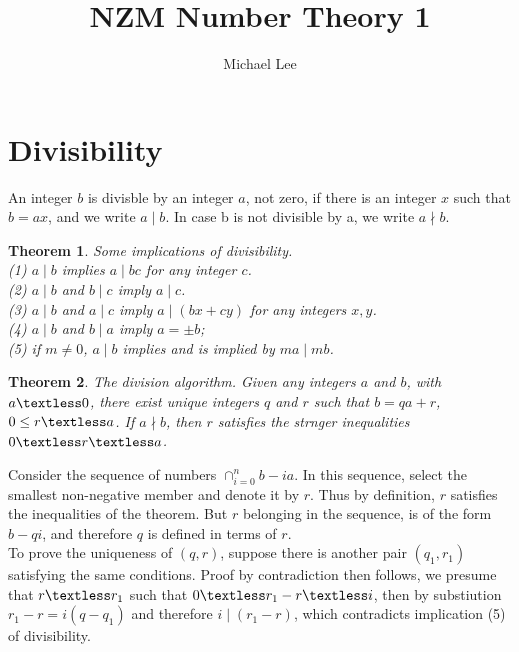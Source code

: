 \documentclass[11pt]{article} %
\title{NZM Number Theory 1}
\author{Michael Lee}
\date{} %
\newtheorem{theorem}{Theorem}[section]
\newenvironment{proof}[1][Proof]{\begin{trivlist}
\item[\hskip \labelsep {\bfseries #1}]}{\end{trivlist}}
\newenvironment{definition}[1][Definition]{\begin{trivlist}
\item[\hskip \labelsep {\bfseries #1}]}{\end{trivlist}}
\begin{document}
\maketitle
\section{Divisibility}
\begin{definition}
	An integer $b$ is divisble by an integer $a$, not zero, if there is an integer $x$ such that $b = ax$, and we write $ a \mid b$. In case b is not divisible by a, we write $ a \nmid b. $ 
\end{definition}

\begin{theorem}
	Some implications of divisibility. 
	\\ (1) $ a \mid b $ implies $ a \mid bc $ for any integer $c$. 
	\\ (2) $ a \mid b $ and $b \mid c$ imply $a \mid c$. 
	\\ (3) $ a \mid b $ and $a \mid c$ imply $a \mid (bx + cy) $ for any integers $x, y$. 
	\\ (4) $ a \mid b $ and $b \mid a$ imply $a = \pm b$; 
	\\ (5) if $m \neq 0$, $ a \mid b $ implies and is implied by $ma \mid mb$. \\
\end{theorem}

\begin{theorem}
	The division algorithm. Given any integers $a$ and $b$, with $a \textless 0$, there exist unique integers $q$ and $r$ such that $b = qa + r$, $0 \le r \textless a$. If $a \nmid b$, then $r$ satisfies the strnger inequalities $0 \textless r \textless a$. 
\end{theorem}

\begin{proof}
	Consider the sequence of numbers $ \cap_{i = 0}^{n}{b - ia} $. In this sequence, select the smallest non-negative member and denote it by $r$. Thus by definition, $r$ satisfies the inequalities of the theorem. But $r$ belonging in the sequence, is of the form $b - qi$, and therefore $q$ is defined in terms of $r$. 
\\ To prove the uniqueness of $ (q, r) $, suppose there is another pair $ (q_1, r_1) $ satisfying the same conditions. Proof by contradiction then follows, we presume that $r \textless r_1$ such that $0 \textless r_1 - r \textless i$, then by substiution $r_1 - r = i(q - q_1)$ and therefore $i \mid (r_1 - r)$, which contradicts implication (5) of divisibility. 
\end{proof}
\end{document}
